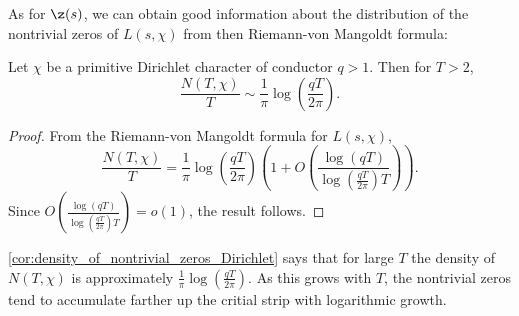       As for $\z(s)$, we can obtain good information about the distribution of the nontrivial zeros of $L(s,\chi)$ from then Riemann-von Mangoldt formula:

      \begin{corollary}\label{cor:density_of_nontrivial_zeros_Dirichlet}
        Let $\chi$ be a primitive Dirichlet character of conductor $q > 1$. Then for $T > 2$,
        \[
          \frac{N(T,\chi)}{T} \sim \frac{1}{\pi}\log\left(\frac{qT}{2\pi}\right).
        \]
      \end{corollary}
      \begin{proof}
        From the Riemann-von Mangoldt formula for $L(s,\chi)$,
        \[
          \frac{N(T,\chi)}{T} = \frac{1}{\pi}\log\left(\frac{qT}{2\pi}\right)\left(1+O\left(\frac{\log(qT)}{\log\left(\frac{qT}{2\pi}\right)T}\right)\right).
        \]
        Since $O\left(\frac{\log(qT)}{\log\left(\frac{qT}{2\pi}\right)T}\right) = o(1)$, the result follows.
      \end{proof}

      \cref{cor:density_of_nontrivial_zeros_Dirichlet} says that for large $T$ the density of $N(T,\chi)$ is approximately $\frac{1}{\pi}\log\left(\frac{qT}{2\pi}\right)$. As this grows with $T$, the nontrivial zeros tend to accumulate farther up the critial strip with logarithmic growth.